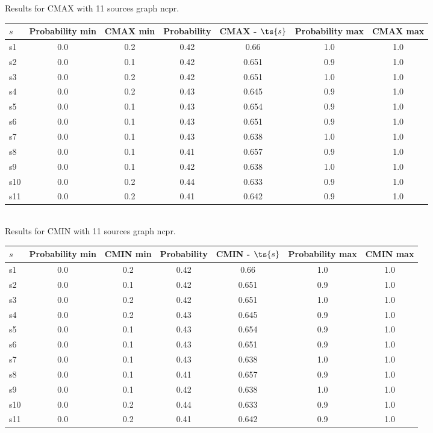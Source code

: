\documentclass{article}
\begin{document}
\noindent Results for CMAX with 11 sources graph ncpr.

\noindent\begin{tabular}{|l|c|c|c|c|c|c|}
\hline
$s$& Probability min & CMAX min & Probability & CMAX - $\ts{s}$ & Probability max & CMAX max\\
\hline
s1 &0.0 & 0.2 & 0.42 & 0.66 & 1.0 & 1.0\\
\hline
s2 &0.0 & 0.1 & 0.42 & 0.651 & 0.9 & 1.0\\
\hline
s3 &0.0 & 0.2 & 0.42 & 0.651 & 1.0 & 1.0\\
\hline
s4 &0.0 & 0.2 & 0.43 & 0.645 & 0.9 & 1.0\\
\hline
s5 &0.0 & 0.1 & 0.43 & 0.654 & 0.9 & 1.0\\
\hline
s6 &0.0 & 0.1 & 0.43 & 0.651 & 0.9 & 1.0\\
\hline
s7 &0.0 & 0.1 & 0.43 & 0.638 & 1.0 & 1.0\\
\hline
s8 &0.0 & 0.1 & 0.41 & 0.657 & 0.9 & 1.0\\
\hline
s9 &0.0 & 0.1 & 0.42 & 0.638 & 1.0 & 1.0\\
\hline
s10 &0.0 & 0.2 & 0.44 & 0.633 & 0.9 & 1.0\\
\hline
s11 &0.0 & 0.2 & 0.41 & 0.642 & 0.9 & 1.0\\
\hline
\end{tabular}\\

\noindent Results for CMIN with 11 sources graph ncpr.

\noindent\begin{tabular}{|l|c|c|c|c|c|c|}
\hline
$s$& Probability min & CMIN min & Probability & CMIN - $\ts{s}$ & Probability max & CMIN max\\
\hline
s1 &0.0 & 0.2 & 0.42 & 0.66 & 1.0 & 1.0\\
\hline
s2 &0.0 & 0.1 & 0.42 & 0.651 & 0.9 & 1.0\\
\hline
s3 &0.0 & 0.2 & 0.42 & 0.651 & 1.0 & 1.0\\
\hline
s4 &0.0 & 0.2 & 0.43 & 0.645 & 0.9 & 1.0\\
\hline
s5 &0.0 & 0.1 & 0.43 & 0.654 & 0.9 & 1.0\\
\hline
s6 &0.0 & 0.1 & 0.43 & 0.651 & 0.9 & 1.0\\
\hline
s7 &0.0 & 0.1 & 0.43 & 0.638 & 1.0 & 1.0\\
\hline
s8 &0.0 & 0.1 & 0.41 & 0.657 & 0.9 & 1.0\\
\hline
s9 &0.0 & 0.1 & 0.42 & 0.638 & 1.0 & 1.0\\
\hline
s10 &0.0 & 0.2 & 0.44 & 0.633 & 0.9 & 1.0\\
\hline
s11 &0.0 & 0.2 & 0.41 & 0.642 & 0.9 & 1.0\\
\hline
\end{tabular}\\
\end{document}
